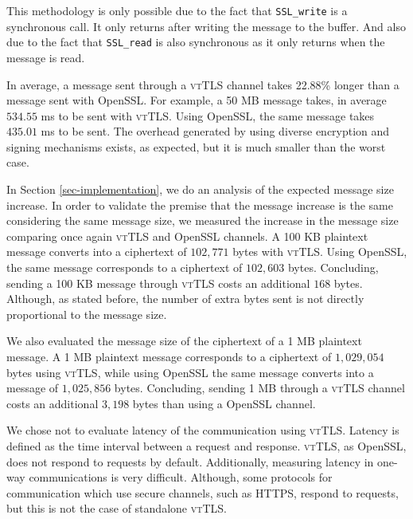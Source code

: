 \documentclass{sig-alternate-05-2015}
\newcommand{\suite}[1]{\texttt{{\footnotesize #1}}}
\begin{document}
This methodology is only possible due to the fact that \suite{SSL\_write} is a synchronous call. It only returns after writing the message to the buffer. And also due to the fact that \suite{SSL\_read} is also synchronous as it only returns when the message is read.

In average, a message sent through a \textsc{vtTLS} channel takes 22.88\% longer than a message sent with OpenSSL. For example, a 50 MB message takes, in average $534.55$ ms to be sent with \textsc{vtTLS}. Using OpenSSL, the same message takes $435.01$ ms to be sent.
The overhead generated by using diverse encryption and signing mechanisms exists, as expected, but it is much smaller than the worst case.



In Section \ref{sec-implementation}, we  do an analysis of the expected message size increase. In order to validate the premise that the message increase is the same considering the same message size, we measured the increase in the message size comparing once again \textsc{vtTLS} and OpenSSL channels.
A 100 KB plaintext message converts into a ciphertext of $102,771$ bytes  with \textsc{vtTLS}. Using OpenSSL, the same message corresponds to a ciphertext of $102,603$ bytes. Concluding, sending a 100 KB message through \textsc{vtTLS} costs an additional $168$ bytes. Although, as stated before, the number of extra bytes sent is not directly proportional to the message size.



We also evaluated the message size of the ciphertext of a 1 MB plaintext message. A 1 MB plaintext message corresponds to a ciphertext of $1,029,054$ bytes using \textsc{vtTLS}, while using OpenSSL the same message converts into a message of $1,025,856$ bytes. Concluding, sending 1 MB through a \textsc{vtTLS} channel costs an additional $3,198$ bytes than using a OpenSSL channel.




We chose not to evaluate latency of the communication using \textsc{vtTLS}. Latency is defined as the time interval between a request and response. \textsc{vtTLS}, as OpenSSL, does not respond to requests by default. Additionally, measuring latency in one-way communications is very difficult. Although, some protocols for communication which use secure channels, such as HTTPS, respond to requests, but this is not the case of standalone \textsc{vtTLS}.
\end{document}
